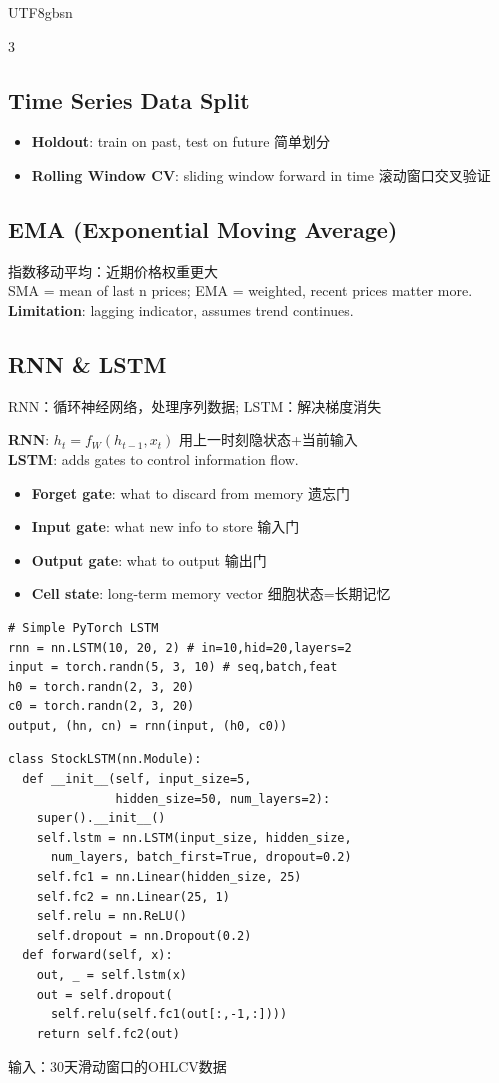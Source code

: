 \documentclass[9pt,landscape,a4paper]{article}
\newcommand{\zhint}[1]{{\scriptsize\color{gray!70!black}#1}}
\begin{document}
\begin{CJK}{UTF8}{gbsn}
\begin{multicols}{3}
\subsection{Time Series Data Split}
\begin{itemize}[leftmargin=8pt,itemsep=0pt,topsep=0pt]
\item \textbf{Holdout}: train on past, test on future \zhint{简单划分}
\item \textbf{Rolling Window CV}: sliding window forward in time \zhint{滚动窗口交叉验证}
\end{itemize}

\subsection{EMA (Exponential Moving Average)}
\zhint{指数移动平均：近期价格权重更大}\\
SMA = mean of last n prices; EMA = weighted, recent prices matter more.\\
\textbf{Limitation}: lagging indicator, assumes trend continues.

\subsection{RNN \& LSTM}
\zhint{RNN：循环神经网络，处理序列数据; LSTM：解决梯度消失}

\textbf{RNN}: $h_t = f_W(h_{t-1}, x_t)$ \zhint{用上一时刻隐状态+当前输入}\\
\textbf{LSTM}: adds gates to control information flow.
\begin{itemize}[leftmargin=8pt,itemsep=0pt,topsep=0pt]
\item \textbf{Forget gate}: what to discard from memory \zhint{遗忘门}
\item \textbf{Input gate}: what new info to store \zhint{输入门}
\item \textbf{Output gate}: what to output \zhint{输出门}
\item \textbf{Cell state}: long-term memory vector \zhint{细胞状态=长期记忆}
\end{itemize}

\begin{lstlisting}
# Simple PyTorch LSTM
rnn = nn.LSTM(10, 20, 2) # in=10,hid=20,layers=2
input = torch.randn(5, 3, 10) # seq,batch,feat
h0 = torch.randn(2, 3, 20)
c0 = torch.randn(2, 3, 20)
output, (hn, cn) = rnn(input, (h0, c0))
\end{lstlisting}

\begin{lstlisting}
class StockLSTM(nn.Module):
  def __init__(self, input_size=5,
               hidden_size=50, num_layers=2):
    super().__init__()
    self.lstm = nn.LSTM(input_size, hidden_size,
      num_layers, batch_first=True, dropout=0.2)
    self.fc1 = nn.Linear(hidden_size, 25)
    self.fc2 = nn.Linear(25, 1)
    self.relu = nn.ReLU()
    self.dropout = nn.Dropout(0.2)
  def forward(self, x):
    out, _ = self.lstm(x)
    out = self.dropout(
      self.relu(self.fc1(out[:,-1,:])))
    return self.fc2(out)
\end{lstlisting}
\zhint{输入：30天滑动窗口的OHLCV数据}


\end{multicols}
\end{CJK}
\end{document}
